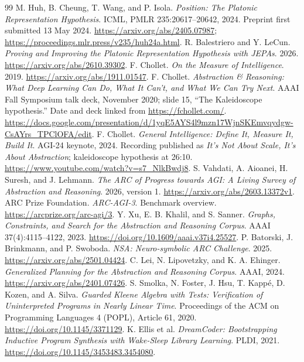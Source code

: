 \documentclass[11pt]{article}
\begin{document}
\begin{thebibliography}{99}
 M. Huh, B. Cheung, T. Wang, and P. Isola. \emph{Position: The Platonic Representation Hypothesis}. ICML, PMLR 235:20617--20642, 2024. Preprint first submitted 13 May 2024. \url{https://arxiv.org/abs/2405.07987}; \url{https://proceedings.mlr.press/v235/huh24a.html}.
 R. Balestriero and Y. LeCun. \emph{Proving and Improving the Platonic Representation Hypothesis with JEPAs}. 2026. \url{https://arxiv.org/abs/2610.39302}.
 F. Chollet. \emph{On the Measure of Intelligence}. 2019. \url{https://arxiv.org/abs/1911.01547}.
 F. Chollet. \emph{Abstraction \& Reasoning: What Deep Learning Can Do, What It Can't, and What We Can Try Next}. AAAI Fall Symposium talk deck, November 2020; slide 15, ``The Kaleidoscope hypothesis.'' Date and deck linked from \url{https://fchollet.com/}. \url{https://docs.google.com/presentation/d/1yqE5AYS4l9mzn17WjnSKEmvqydgw-CsAYrs_TPClOFA/edit}.
 F. Chollet. \emph{General Intelligence: Define It, Measure It, Build It}. AGI-24 keynote, 2024. Recording published as \emph{It's Not About Scale, It's About Abstraction}; kaleidoscope hypothesis at 26:10. \url{https://www.youtube.com/watch?v=s7_NlkBwdj8}.
 S. Vahdati, A. Aioanei, H. Suresh, and J. Lehmann. \emph{The ARC of Progress towards AGI: A Living Survey of Abstraction and Reasoning}. 2026, version 1. \url{https://arxiv.org/abs/2603.13372v1}.
 ARC Prize Foundation. \emph{ARC-AGI-3}. Benchmark overview. \url{https://arcprize.org/arc-agi/3}.
 Y. Xu, E. B. Khalil, and S. Sanner. \emph{Graphs, Constraints, and Search for the Abstraction and Reasoning Corpus}. AAAI 37(4):4115--4122, 2023. \url{https://doi.org/10.1609/aaai.v37i4.25527}.
 P. Batorski, J. Brinkmann, and P. Swoboda. \emph{NSA: Neuro-symbolic ARC Challenge}. 2025. \url{https://arxiv.org/abs/2501.04424}.
 C. Lei, N. Lipovetzky, and K. A. Ehinger. \emph{Generalized Planning for the Abstraction and Reasoning Corpus}. AAAI, 2024. \url{https://arxiv.org/abs/2401.07426}.
 S. Smolka, N. Foster, J. Hsu, T. Kapp\'e, D. Kozen, and A. Silva. \emph{Guarded Kleene Algebra with Tests: Verification of Uninterpreted Programs in Nearly Linear Time}. Proceedings of the ACM on Programming Languages 4 (POPL), Article 61, 2020. \url{https://doi.org/10.1145/3371129}.
 K. Ellis et al. \emph{DreamCoder: Bootstrapping Inductive Program Synthesis with Wake-Sleep Library Learning}. PLDI, 2021. \url{https://doi.org/10.1145/3453483.3454080}.

\end{thebibliography}
\end{document}
